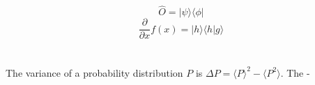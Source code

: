 \documentclass{article}
\begin{document}
\section{}

\[
  \hat{O}=|\psi\rangle\langle \phi|
\]
\[
  \frac{\partial}{\partial x}f(x)=|h\rangle\langle h|g \rangle
\]

\section{}
The variance of a probability distribution $P$ is $\Delta P=\langle  P\rangle^{2}-\langle P^{2} \rangle$.
The -
\end{document}
